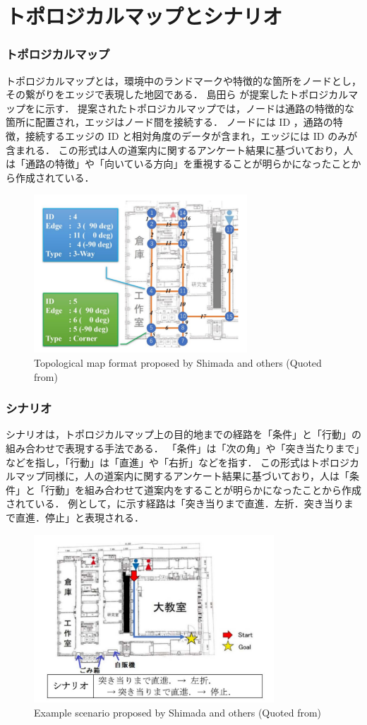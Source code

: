 \section{トポロジカルマップとシナリオ}
\subsubsection{トポロジカルマップ}
トポロジカルマップとは，環境中のランドマークや特徴的な箇所をノードとし，その繋がりをエッジで表現した地図である．
島田ら \cite{shimada2020}が提案したトポロジカルマップをに示す．
提案されたトポロジカルマップでは，ノードは通路の特徴的な箇所に配置され，エッジはノード間を接続する．
ノードには ID ，通路の特徴，接続するエッジの ID と相対角度のデータが含まれ，エッジには ID のみが含まれる．
この形式は人の道案内に関するアンケート結果に基づいており，人は「通路の特徴」や「向いている方向」を重視することが明らかになったことから作成されている．

\begin{figure}[htbp]
  \centering
  \includegraphics[width=80mm]{images/pdf/shimada/topo.pdf}
  \caption[Topological map format proposed by Shimada and others]{Topological map format proposed by Shimada and others (Quoted from\cite{shimada2020})}
  \label{fig:shimada_topo}
\end{figure}

\clearpage
\subsubsection{シナリオ}
シナリオは，トポロジカルマップ上の目的地までの経路を「条件」と「行動」の組み合わせで表現する手法である．
「条件」は「次の角」や「突き当たりまで」などを指し，「行動」は「直進」や「右折」などを指す．
この形式はトポロジカルマップ同様に，人の道案内に関するアンケート結果に基づいており，人は「条件」と「行動」を組み合わせて道案内をすることが明らかになったことから作成されている．
例として，に示す経路は「突き当りまで直進．左折．突き当りまで直進．停止」と表現される．

\begin{figure}[htbp]
  \centering
  \includegraphics[width=90mm]{images/pdf/shimada/scenario.pdf}
  \caption[Example scenario proposed by Shimada and others]{Example scenario proposed by Shimada and others (Quoted from\cite{shimada2020})}
  \label{fig:shimada_scenario}
\end{figure}